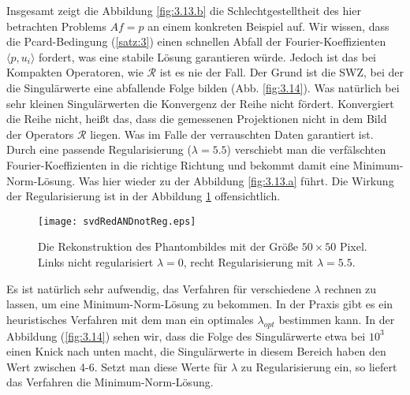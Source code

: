 Insgesamt zeigt die Abbildung \ref{fig:3.13.b} die Schlechtgestelltheit des hier betrachten Problems $Af = p$ an einem konkreten Beispiel auf. Wir wissen, dass die Pcard-Bedingung (\ref{satz:3}) einen schnellen Abfall der Fourier-Koeffizienten $\langle p, u_i \rangle$ fordert, was eine stabile Lösung garantieren würde. Jedoch ist das bei Kompakten Operatoren, wie $\mathcal{R}$ ist es nie der Fall. Der Grund ist die SWZ, bei der die Singulärwerte eine abfallende Folge bilden (Abb. \ref{fig:3.14}). Was natürlich bei sehr kleinen Singulärwerten die Konvergenz der Reihe nicht fördert. Konvergiert die Reihe nicht, heißt das, dass die gemessenen Projektionen nicht in dem Bild der Operators $\mathcal{R}$ liegen. Was im Falle der verrauschten Daten garantiert ist. Durch eine passende Regularisierung ($\lambda = 5.5$) verschiebt man die verfälschten Fourier-Koeffizienten in die richtige Richtung und bekommt damit eine Minimum-Norm-Lösung. Was hier wieder zu der Abbildung \ref{fig:3.13.a} führt. Die Wirkung der Regularisierung ist in der Abbildung \ref{fig:3.15} offensichtlich.
\begin{figure}[!h]
	\centering
	\texttt{[image: svdRedANDnotReg.eps]}
	\caption{Die Rekonstruktion des Phantombildes mit der Größe $50\times50$ Pixel. Links nicht regularisiert $\lambda = 0$, recht Regularisierung mit $\lambda=5.5$.}
	\label{fig:3.15}
\end{figure}

Es ist natürlich sehr aufwendig, das Verfahren für verschiedene $\lambda$ rechnen zu lassen, um eine Minimum-Norm-Lösung zu bekommen. In der Praxis gibt es ein heuristisches Verfahren mit dem man ein optimales $\lambda_{opt}$ bestimmen kann. In der Abbildung (\ref{fig:3.14}) sehen wir, dass die Folge des Singulärwerte etwa bei $10^3$ einen Knick nach unten macht, die Singulärwerte in diesem Bereich haben den Wert zwischen 4-6. Setzt man diese Werte für $\lambda$ zu Regularisierung ein, so liefert das Verfahren die Minimum-Norm-Lösung.